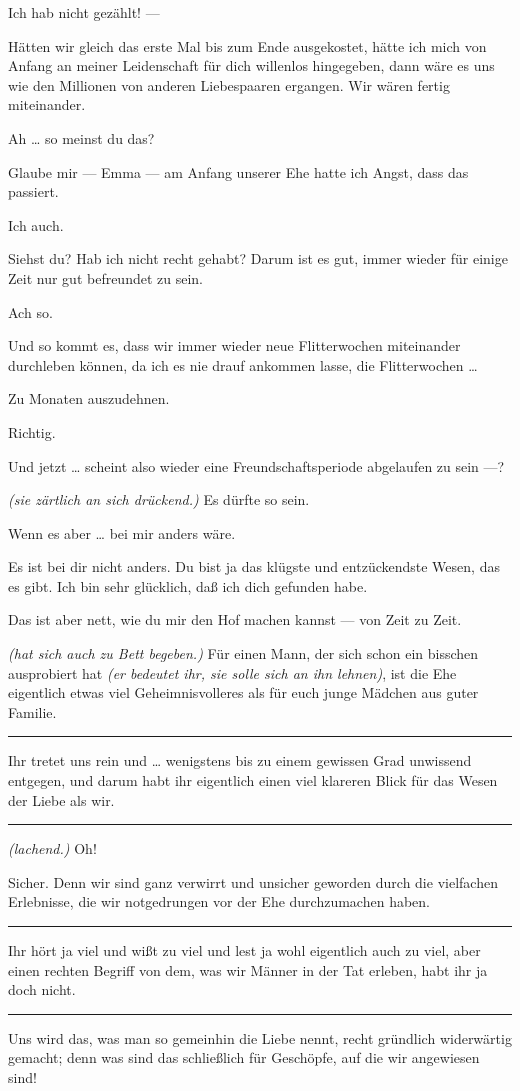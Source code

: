 \documentclass[
	final,
	a4paper,
	ngerman,
	mpinclude = true, %
	twoside = true,
	open = right,
	cleardoublepage = plain,
	DIV = 13,
	BCOR = 1cm,
	titlepage = firstiscover,
	]{scrbook}
\newcommand{\direction}[1]{\textit{(#1)}}
\newenvironment{deletion}{%
		\vspace{0.25\baselineskip}
		\hrule
		\vspace{0.25\baselineskip}
		\color{darkgray}
	}{
		\color{black}
		\vspace{0.25\baselineskip}
		\hrule 
		\vspace{0.25\baselineskip}
	}
\newcommand{\thecharacter}[1]{\textup{\textsc{#1}}\xspace}
\newcommand{\thefrau}{\thecharacter{Emma}}
\newcommand{\thegatte}{\thecharacter{Christian}}
\newcommand{\character}[1]{\item[#1:]}
\newcommand{\frau}{\character{\thefrau}}
\newcommand{\gatte}{\character{\thegatte}}
\begin{document}
\begin{play}
	\frau
	Ich hab nicht gezählt! ---

	\gatte
	Hätten wir gleich das erste Mal bis zum Ende ausgekostet, hätte ich mich von Anfang an meiner Leidenschaft für dich willenlos hingegeben, dann wäre es uns wie den Millionen von anderen Liebespaaren ergangen. Wir wären fertig miteinander.

	\frau
	Ah \ldots{} so meinst du das?

	\gatte
	Glaube mir --- Emma --- am Anfang unserer Ehe hatte ich Angst, dass das passiert.

	\frau
	Ich auch.

	\gatte
	Siehst du? Hab ich nicht recht gehabt? Darum ist es gut, immer wieder für einige Zeit nur gut befreundet zu sein.

	\frau
	Ach so.

	\gatte
	Und so kommt es, dass wir immer wieder neue Flitterwochen miteinander durchleben können, da ich es nie drauf ankommen lasse, die Flitterwochen \ldots{}

	\frau
	Zu Monaten auszudehnen.

	\gatte
	Richtig.

	\frau
	Und jetzt \ldots{} scheint also wieder eine Freundschaftsperiode abgelaufen zu sein ---?

	\gatte
	\direction{sie zärtlich an sich drückend.} Es dürfte so sein.

	\frau
	Wenn es aber \ldots{} bei mir anders wäre.

	\gatte
	Es ist bei dir nicht anders. Du bist ja das klügste und entzückendste Wesen, das es gibt. Ich bin sehr glücklich, daß ich dich gefunden habe.

	\frau
	Das ist aber nett, wie du mir den Hof machen kannst --- von Zeit zu Zeit.

	\gatte
	\direction{hat sich auch zu Bett begeben.} Für einen Mann, der sich schon ein bisschen ausprobiert hat \direction{er bedeutet ihr, sie solle sich an ihn lehnen}, ist die Ehe eigentlich etwas viel Geheimnisvolleres als für euch junge Mädchen aus guter Familie.
	\begin{deletion}
		Ihr tretet uns rein und \ldots{} wenigstens bis zu einem gewissen Grad unwissend entgegen, und darum habt ihr eigentlich einen viel klareren Blick für das Wesen der Liebe als wir.
	\end{deletion}

	\frau
	\direction{lachend.} Oh!

	\gatte
	Sicher. Denn wir sind ganz verwirrt und unsicher geworden durch die vielfachen Erlebnisse, die wir notgedrungen vor der Ehe durchzumachen haben.
	\begin{deletion}
		Ihr hört ja viel und wißt zu viel und lest ja wohl eigentlich auch zu viel, aber einen rechten Begriff von dem, was wir Männer in der Tat erleben, habt ihr ja doch nicht.
	\end{deletion}
	Uns wird das, was man so gemeinhin die Liebe nennt, recht gründlich widerwärtig gemacht; denn was sind das schließlich für Geschöpfe, auf die wir angewiesen sind!


\end{play}
\end{document}
